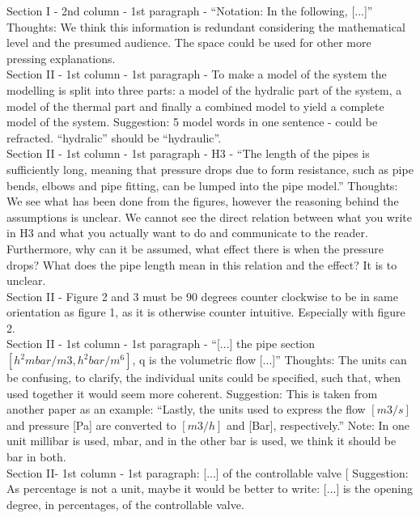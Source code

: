\noindent Section I - 2nd column - 1st paragraph - “Notation: In the following, [...]”
Thoughts: We think this information is redundant considering the mathematical level and the presumed audience. The space could be used for other more pressing explanations.\\


\noindent Section II - 1st column - 1st paragraph - To make a model of the system the modelling is split into three parts: a model of the hydralic part of the system, a model of the thermal part and finally a combined model to yield a complete model of the system.
Suggestion: 5 model words in one sentence - could be refracted. “hydralic” should be “hydraulic”.\\


\noindent Section II - 1st column - 1st paragraph - H3 - “The length of the pipes is sufficiently long, meaning that pressure drops due to form resistance, such as pipe bends, elbows and pipe fitting, can be lumped into the pipe model.”
Thoughts: We see what has been done from the figures, however the reasoning behind the assumptions is unclear. We cannot see the direct relation between what you write in H3 and what you actually want to do and communicate to the reader. Furthermore, why can it be assumed, what effect there is when the pressure drops? What does the pipe length mean in this relation and the effect? It is to unclear.\\


\noindent Section II - Figure 2 and 3 must be 90 degrees counter clockwise to be in same orientation as figure 1, as it is otherwise counter intuitive. Especially with figure 2.\\


\noindent Section II - 1st column - 1st paragraph - “[...] the pipe section $[h^2 mbar / m3, h^2 bar/m^6]$, q is the volumetric flow  [...]”
Thoughts: The units can be confusing, to clarify, the individual units could be specified, such that, when used together it would seem more coherent.
Suggestion: This is taken from another paper as an example: “Lastly, the units used to express the flow $[m3/s]$ and pressure [Pa] are converted to $[m3/h]$ and [Bar], respectively.”
Note: In one unit millibar is used, mbar, and in the other bar is used, we think it should be bar in both.\\


\noindent Section II- 1st column - 1st paragraph: [...] of the controllable valve [%
Suggestion: As percentage is not a unit, maybe it would be better to write: [...] is the opening degree, in percentages, of the controllable valve. \\


